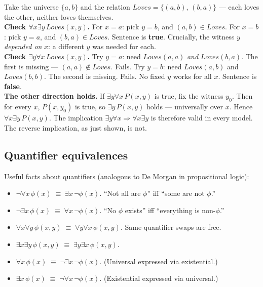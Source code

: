 \documentclass[11pt, a4paper]{article}
\begin{document}
\begin{exbox}
Take the universe $\{a, b\}$ and the relation $Loves = \{(a,b),\, (b,a)\}$ — each loves the other, neither loves themselves.\\[0.3em]
\textbf{Check $\forall x \exists y \, Loves(x,y)$.} For $x = a$: pick $y = b$, and $(a,b) \in Loves$. \checkmark{} For $x = b$: pick $y = a$, and $(b,a) \in Loves$. \checkmark{} Sentence is \textbf{true}. Crucially, the witness $y$ \emph{depended on} $x$: a different $y$ was needed for each.\\[0.3em]
\textbf{Check $\exists y \forall x \, Loves(x,y)$.} Try $y = a$: need $Loves(a,a)$ \emph{and} $Loves(b,a)$. The first is missing — $(a,a) \notin Loves$. Fails. Try $y = b$: need $Loves(a,b)$ and $Loves(b,b)$. The second is missing. Fails. No fixed $y$ works for all $x$. Sentence is \textbf{false}.\\[0.3em]
\textbf{The other direction holds.} If $\exists y \forall x \, P(x,y)$ is true, fix the witness $y_0$. Then for every $x$, $P(x, y_0)$ is true, so $\exists y \, P(x,y)$ holds — universally over $x$. Hence $\forall x \exists y \, P(x,y)$. The implication $\exists y \forall x \Rightarrow \forall x \exists y$ is therefore valid in every model. The reverse implication, as just shown, is not.
\end{exbox}

\subsection{Quantifier equivalences}

Useful facts about quantifiers (analogous to De Morgan in propositional logic):
\begin{itemize}
  \item $\neg \forall x \, \phi(x) \;\equiv\; \exists x \, \neg \phi(x)$. ``Not all are $\phi$'' iff ``some are not $\phi$.''
  \item $\neg \exists x \, \phi(x) \;\equiv\; \forall x \, \neg \phi(x)$. ``No $\phi$ exists'' iff ``everything is non-$\phi$.''
  \item $\forall x \forall y \, \phi(x, y) \;\equiv\; \forall y \forall x \, \phi(x, y)$. Same-quantifier swaps are free.
  \item $\exists x \exists y \, \phi(x, y) \;\equiv\; \exists y \exists x \, \phi(x, y)$.
  \item $\forall x \, \phi(x) \;\equiv\; \neg \exists x \, \neg \phi(x)$. (Universal expressed via existential.)
  \item $\exists x \, \phi(x) \;\equiv\; \neg \forall x \, \neg \phi(x)$. (Existential expressed via universal.)
\end{itemize}
\end{document}
